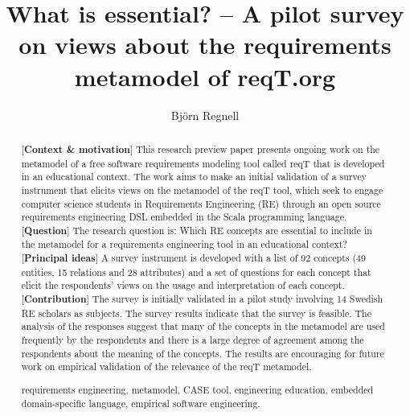 \documentclass[runningheads,a4paper]{llncs}
\newcommand{\keywords}[1]{\par\addvspace\baselineskip
\noindent\keywordname\enspace\ignorespaces#1}
\begin{document}

\mainmatter  %

\title{What is essential? -- A pilot survey on views about the requirements metamodel of reqT.org}

\author{Bj\"orn Regnell}
%


\maketitle

\begin{abstract}
[{\bf Context \& motivation}] This research preview paper presents ongoing work on the metamodel of a free software requirements modeling tool called reqT that is developed in an educational context. The work aims to make an initial validation of a survey instrument that elicits views on the metamodel of the reqT tool, which seek to engage computer science students in Requirements Engineering (RE) through an open source requirements engineering DSL embedded in the Scala programming language. [{\bf Question}] The research question is: Which RE concepts are essential to include in the metamodel for a requirements engineering tool in an educational context?  [{\bf Principal ideas}] A survey instrument is developed with a list of 92 concepts (49 entities, 15 relations and 28 attributes) and a set of questions for each concept that elicit the respondents' views on the usage and interpretation of each concept.  [{\bf Contribution}] The survey is initially validated in a pilot study involving 14 Swedish RE scholars as subjects. The survey results indicate that the survey is feasible. The analysis of the responses suggest that many of the concepts in the metamodel are used frequently by the respondents and there is a large degree of agreement among the respondents about the meaning of the concepts. The results are encouraging for future work on empirical validation of the relevance of the reqT metamodel. 

\keywords{requirements engineering, metamodel, CASE tool, engineering education, embedded domain-specific language, empirical software engineering.}
\end{abstract}
\end{document}
